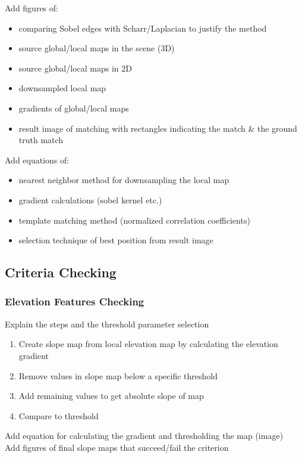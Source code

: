 \noindent
Add figures of:
\begin{itemize}
    \item comparing Sobel edges with Scharr/Laplacian to justify the method
    \item source global/local maps in the scene (3D)
    \item source global/local maps in 2D
    \item downsampled local map
    \item gradients of global/local maps
    \item result image of matching with rectangles indicating the match \& the ground truth match
\end{itemize}

\noindent
Add equations of:
\begin{itemize}
    \item nearest neighbor method for downsampling the local map
    \item gradient calculations (sobel kernel etc.)
    \item template matching method (normalized correlation coefficients)
    \item selection technique of best position from result image
\end{itemize}

\subsection{Criteria Checking}

\subsubsection{Elevation Features Checking}

Explain the steps and the threshold parameter selection

\begin{enumerate}
    \item Create slope map from local elevation map by calculating the elevation gradient
    \item Remove values in slope map below a specific threshold
    \item Add remaining values to get absolute slope of map
    \item Compare to threshold
\end{enumerate}

\noindent
Add equation for calculating the gradient and thresholding the map (image)\\
Add figures of final slope maps that succeed/fail the criterion

